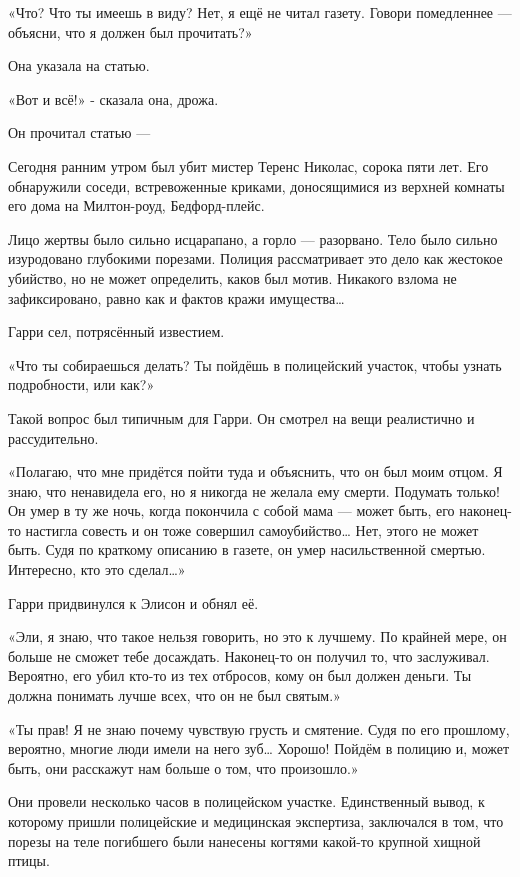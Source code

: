 \documentclass[a4paper,12pt]{book}
\begin{document}
«Что? Что ты имеешь в виду? Нет, я ещё не читал газету. Говори помедленнее — объясни, что я должен был прочитать?»
\par
Она указала на статью.
\par
«Вот и всё!» - сказала она, дрожа.
\par
Он прочитал статью —\\
\par
Сегодня ранним утром был убит мистер Теренс Николас, сорока пяти лет. Его обнаружили соседи, встревоженные криками, доносящимися из верхней комнаты его дома на Милтон-роуд, Бедфорд-плейс.
\par
Лицо жертвы было сильно исцарапано, а горло — разорвано. Тело было сильно изуродовано глубокими порезами. Полиция рассматривает это дело как жестокое убийство, но не может определить, каков был мотив. Никакого взлома не зафиксировано, равно как и фактов кражи имущества…\\
\par
Гарри сел, потрясённый известием.
\par
«Что ты собираешься делать? Ты пойдёшь в полицейский участок, чтобы узнать подробности, или как?»
\par
Такой вопрос был типичным для Гарри. Он смотрел на вещи реалистично и рассудительно.
\par
«Полагаю, что мне придётся пойти туда и объяснить, что он был моим отцом. Я знаю, что ненавидела его, но я никогда не желала ему смерти. Подумать только! Он умер в ту же ночь, когда покончила с собой мама — может быть, его наконец-то настигла совесть и он тоже совершил самоубийство… Нет, этого не может быть. Судя по краткому описанию в газете, он умер насильственной смертью. Интересно, кто это сделал…»
\par
Гарри придвинулся к Элисон и обнял её.
\par
«Эли, я знаю, что такое нельзя говорить, но это к лучшему. По крайней мере, он больше не сможет тебе досаждать. Наконец-то он получил то, что заслуживал. Вероятно, его убил кто-то из тех отбросов, кому он был должен деньги. Ты должна понимать лучше всех, что он не был святым.»
\par
«Ты прав! Я не знаю почему чувствую грусть и смятение. Судя по его прошлому, вероятно, многие люди имели на него зуб… Хорошо! Пойдём в полицию и, может быть, они расскажут нам больше о том, что произошло.»
\par
Они провели несколько часов в полицейском участке. Единственный вывод, к которому пришли полицейские и медицинская экспертиза, заключался в том, что порезы на теле погибшего были нанесены когтями какой-то крупной хищной птицы.
\end{document}
